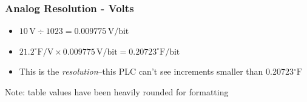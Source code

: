 \begin{frame}
    \frametitle{Analog Resolution - Volts}

    \begin{itemize}
        \item $10\,\text{V} \div 1023 = 0.009775\,\text{V/bit}$
        \item $21.2^\circ\text{F/V} \times 0.009775\,\text{V/bit} = 0.20723^\circ\text{F/bit}$
        \item This is the \emph{resolution}--this PLC can't see increments smaller than 0.20723$^\circ\text{F}$
    \end{itemize}

    \vspace{1em}

    \begin{table}
        \centering
        {\scriptsize Note: table values have been heavily rounded for formatting\par}
    \end{table}
\end{frame}

